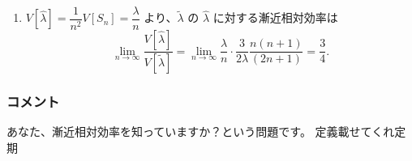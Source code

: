 \documentclass[./main.tex]{subfiles}
\begin{document}
\begin{enumerate}
        \item $V[\hat{\lambda}] = \dfrac{1}{n^2} V[S_n] = \dfrac{\lambda}{n}$ より、$\tilde{\lambda}$ の $\hat{\lambda}$ に対する漸近相対効率は
        \begin{equation*}
            \lim_{n \to \infty} \frac{V [ \hat{\lambda}]}{V [ \tilde{\lambda} ]}
                = \lim_{n \to \infty}
                    \frac{\lambda}{n} \cdot \frac{3}{2\lambda}\frac{n (n + 1)}{(2n + 1)} 
                = \frac{3}{4}.
        \end{equation*}


    \end{enumerate}
    \subsubsection*{コメント}
    あなた、漸近相対効率を知っていますか？という問題です。
    定義載せてくれ定期
\end{document}
